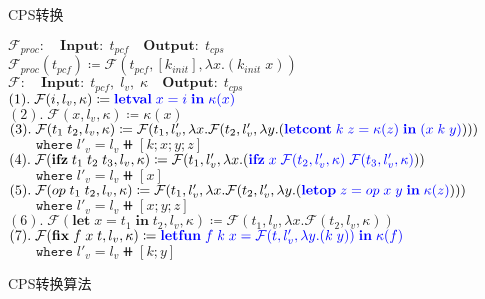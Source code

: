 \begin{figure}[t]
    \centering
    \vspace{2ex}
    \begin{algorithm}[H]
        \caption{CPS转换}
        \SetAlgoLined
        $\mathcal{F}_{proc}:\quad \mathbf{Input:}\; t_{pcf}\quad \mathbf{Output:}\; t_{cps}$\\
        $\mathcal{F}_{proc}(t_{pcf})\coloneqq \mathbf{\mathcal{F}}(t_{pcf}, [k_{init}], \lambda x. (k_{init}\; x))$\\
        \vspace*{0.5em}
        $\mathcal{F}:\quad \mathbf{Input:}\; t_{pcf},\; l_v,\; \kappa \quad \mathbf{Output:}\; t_{cps}$\\ 
        $(1).\; \mathbf{\mathcal{F}}(i, l_v, \kappa) \coloneqq \textcolor{blue}{\mathbf{letval}\; x= i\; \mathbf{in}\; \kappa(x)} $ \\
        $(2).\; \mathbf{\mathcal{F}}(x, l_v, \kappa) \coloneqq \kappa(x) $ \\
        $(3).\; \mathbf{\mathcal{F}}(t_1\; t_2, l_v, \kappa) \coloneqq \mathbf{\mathcal{F}}(t_1, l'_v,\lambda x. \mathbf{\mathcal{F}}(t_2, l'_v, \lambda y. (\textcolor{blue}{\mathbf{letcont}\; k\; z=\kappa(z)\; \mathbf{in}\; (x\; k\; y)})))$ \\
        $\quad\quad \mathtt{where}\; l'_v = l_v \doubleplus [k;x;y;z]$ \\
        $(4).\; \mathbf{\mathcal{F}}(\mathbf{ifz}\; t_1\; t_2\; t_3, l_v, \kappa) \coloneqq \mathbf{\mathcal{F}}(t_1, l'_v, \lambda x. (\textcolor{blue}{\mathbf{ifz}\; x\; \mathbf{\mathcal{F}}(t_2, l'_v, \kappa)\; \mathbf{\mathcal{F}}(t_3, l'_v, \kappa)}))  $ \\
        $\quad\quad \mathtt{where}\; l'_v = l_v \doubleplus [x]$ \\
        $(5).\; \mathbf{\mathcal{F}}(op\; t_1\; t_2, l_v, \kappa) \coloneqq \mathbf{\mathcal{F}}(t_1, l'_v,\lambda x.\mathbf{\mathcal{F}}(t_2, l'_v, \lambda y. (\textcolor{blue}{\mathbf{letop}\; z=op\; x\; y\; \mathbf{in}\; \kappa(z)}))) $ \\
        $\quad\quad \mathtt{where}\; l'_v = l_v \doubleplus [x;y;z]$ \\
        $(6).\; \mathbf{\mathcal{F}}(\mathbf{let}\; x=t_1\; \mathbf{in}\; t_2, l_v, \kappa) \coloneqq \mathbf{\mathcal{F}}(t_1, l_v, \lambda x. \mathbf{\mathcal{F}}(t_2, l_v, \kappa)) $ \\
        $(7).\; \mathbf{\mathcal{F}}(\mathbf{fix}\; f\; x\; t, l_v, \kappa) \coloneqq \textcolor{blue}{\mathbf{letfun}\; f\; k\; x= \mathbf{\mathcal{F}}(t, l'_v, \lambda y. (k\; y))\; \mathbf{in}\; \kappa(f)}$ \\
        $\quad\quad \mathtt{where}\; l'_v = l_v \doubleplus [k;y]$
    \end{algorithm}
    \caption{CPS转换算法}\label{algo:cpstrans}
\end{figure}

